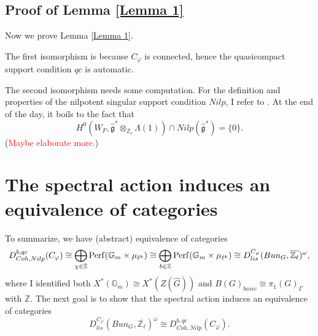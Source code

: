 \subsection{Proof of Lemma \ref{Lemma 1}}
Now we prove Lemma \ref{Lemma 1}. 

The first isomorphism is because $C_{\varphi}$ is connected, hence the quasicompact support condition $qc$ is automatic. 

The second isomorphism needs some computation. For the definition and properties of the nilpotent singular support condition $Nilp$, I refer to \cite[Section VIII.2]{fargues2021geometrization}. At the end of the day, it boils to the fact that
$$H^0(W_F, \hat{\mathfrak{g}}^*\otimes_{\mathbb{Z}_{\ell}}\Lambda(1)) \cap Nilp(\hat{\mathfrak{g}}^*)=\{0\}.$$ (\textcolor{red}{Maybe elaborate more.})


\section{The spectral action induces an equivalence of categories}
To summarize, we have (abstract) equivalence of categories
$$D^{b, qc}_{Coh, Nilp}(C_{\varphi}) \cong \bigoplus_{\chi \in \mathbb{Z}}\operatorname{\operatorname{Perf}}(\mathbb{G}_m \times \mu_{\ell^k}) \cong \bigoplus_{b \in \mathbb{Z}}\operatorname{\operatorname{Perf}}(\mathbb{G}_m \times \mu_{\ell^k}) \cong D^{C_{\varphi}}_{lis}(Bun_G, \overline{\mathbb{Z}_{\ell}})^{\omega},$$
where I identified both $X^*(\mathbb{G}_m) \cong X^*(Z(\hat{G}))$ and $B(G)_{basic} \cong \pi_1(G)_{\Gamma}$ with $\mathbb{Z}$. The next goal is to show that the spectral action induces an equivalence of categories
\begin{equation}\label{Equiv}
	D_{lis}^{C_{\varphi}}(Bun_G, \overline{\mathbb{Z}_{\ell}})^{\omega} \cong D^{b, qc}_{Coh, Nilp}(C_{\varphi}).
\end{equation}

%

